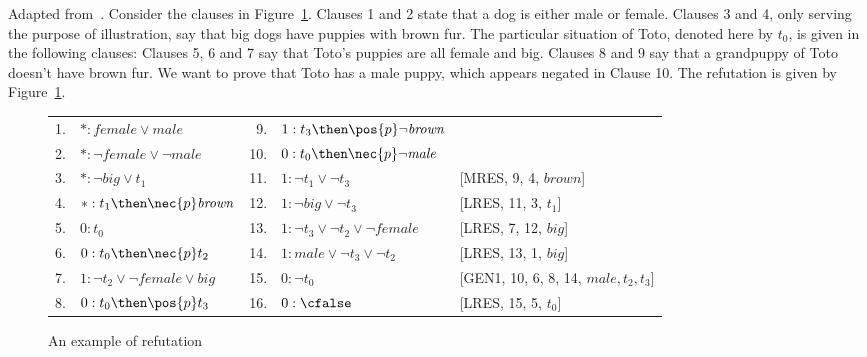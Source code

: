 \begin{example}
    Adapted from~\cite{Areces:1999:PRR,nalon2015modal}. Consider the clauses in
    Figure~\ref{tab:calcunsat}. Clauses 1 and 2 state that a dog is either
    male or female. Clauses 3 and 4, only serving the purpose of illustration,
    say that big dogs have puppies with brown fur. The particular situation
    of Toto, denoted here by $t_0$, is given in the following clauses: Clauses
    5, 6 and 7 say that Toto's puppies are all female and big. Clauses 8 and 9
    say that a grandpuppy of Toto doesn't have brown fur. We want to prove that
    Toto has a male puppy, which appears negated in Clause 10. The refutation is
    given by Figure~\ref{tab:calcunsat}. 

    \begin{figure}[h!]%
        \centering%
        \begin{tabular}{rlrll}
            1.&$* : \mathit{female} \lor \mathit{male}$           & 9. &$1 : t_3 \then \pos{p} \neg \mathit{brown}$            & \\
            2.&$* : \neg \mathit{female} \lor \neg \mathit{male}$ & 10.&$0 : t_0 \then \nec{p} \neg \mathit{male}$             & \\ 
            3.&$* : \neg \mathit{big} \lor t_1$                   & 11.&$1 : \neg t_1 \lor \neg t_3$                           & [MRES, 9, 4, $\mathit{brown}$]\\
            4.&$* : t_1 \then \nec{p} \mathit{brown}$             & 12.&$1 : \neg \mathit{big} \lor \neg t_3$                  & [LRES, 11, 3, $t_1$]\\
            5.&$0 : t_0$                                          & 13.&$1 : \neg t_3 \lor \neg t_2 \lor \neg \mathit{female}$ & [LRES, 7, 12, $\mathit{big}$]\\
            6.&$0 : t_0 \then \nec{p} t_2$                        & 14.&$1 : \mathit{male} \lor \neg t_3 \lor \neg t_2$        & [LRES, 13, 1, $\mathit{big}$]\\
            7.&$1 : \neg t_2 \lor \neg \mathit{female} \lor \mathit{big}$ & 15.&$0 : \neg t_0$ & [GEN1, 10, 6, 8, 14, $\mathit{male},t_2,t_3$]\\
            8.&$0 : t_0 \then \pos{p} t_3$                        & 16.&$0 : \cfalse$ & [LRES, 15, 5, $t_0$]\\
       \end{tabular}%
        \caption{An example of refutation}%
        \label{tab:calcunsat}
    \end{figure}
\end{example}

